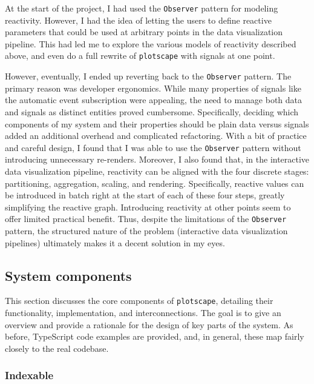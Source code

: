 \documentclass[
  openany]{book}
\theoremstyle{definition}
\theoremstyle{definition}
\theoremstyle{definition}
\theoremstyle{definition}
\theoremstyle{remark}
\begin{document}
At the start of the project, I had used the \texttt{Observer} pattern for modeling reactivity. However, I had the idea of letting the users to define reactive parameters that could be used at arbitrary points in the data visualization pipeline. This had led me to explore the various models of reactivity described above, and even do a full rewrite of \texttt{plotscape} with signals at one point.

However, eventually, I ended up reverting back to the \texttt{Observer} pattern. The primary reason was developer ergonomics. While many properties of signals like the automatic event subscription were appealing, the need to manage both data and signals as distinct entities proved cumbersome. Specifically, deciding which components of my system and their properties should be plain data versus signals added an additional overhead and complicated refactoring. With a bit of practice and careful design, I found that I was able to use the \texttt{Observer} pattern without introducing unnecessary re-renders. Moreover, I also found that, in the interactive data visualization pipeline, reactivity can be aligned with the four discrete stages: partitioning, aggregation, scaling, and rendering. Specifically, reactive values can be introduced in batch right at the start of each of these four steps, greatly simplifying the reactive graph. Introducing reactivity at other points seem to offer limited practical benefit. Thus, despite the limitations of the \texttt{Observer} pattern, the structured nature of the problem (interactive data visualization pipelines) ultimately makes it a decent solution in my eyes.

\subsection{System components}\label{components}

This section discusses the core components of \texttt{plotscape}, detailing their functionality, implementation, and interconnections. The goal is to give an overview and provide a rationale for the design of key parts of the system. As before, TypeScript code examples are provided, and, in general, these map fairly closely to the real codebase.

\subsubsection{Indexable}\label{indexable}
\end{document}
